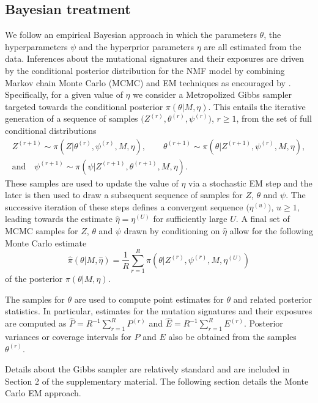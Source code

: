 \documentclass{bioinfo}
\begin{document}
\subsection{Bayesian treatment}
We follow an empirical Bayesian approach in which the parameters
$\theta$, the hyperparameters $\psi$ and the hyperprior parameters
$\eta$ are all estimated from the data.  Inferences about the
mutational signatures and their exposures are driven by the
conditional posterior distribution for the NMF model by combining
Markov chain Monte Carlo (MCMC) and EM techniques as encouraged by
\cite{C01}. Specifically, for a given value of $\eta$ we consider a
Metropolized Gibbs sampler targeted towards the conditional posterior
$\pi(\theta|M, \eta)$. This entails the iterative generation of a
sequence of samples $\big(Z^{(r)}, \theta^{(r)}, \psi^{(r)}\big)$, $r
\geqslant 1$, from the set of full conditional distributions
\begin{gather*}
   Z^{(r+1)} \sim \pi(Z| \theta^{(r)}, \psi^{(r)}, M, \eta), \qquad
   \theta^{(r+1)} \sim \pi(\theta| Z^{(r+1)}, \psi^{(r)}, M, \eta), \\
       \text{and}\quad
   \psi^{(r+1)} \sim \pi(\psi| Z^{(r+1)}, \theta^{(r+1)}, M, \eta).
\end{gather*}
These samples are used to update the value of $\eta$ via a
stochastic EM step and the later is then used to draw a subsequent
sequence of samples for $Z$, $\theta$ and $\psi$. The successive iteration of these steps defines a 
convergent sequence $\big(\eta^{(u)}\big)$, $u \geq 1$, leading
towards the estimate $\hat\eta = \eta^{(U)}$ for
sufficiently large $U$. A final set of MCMC samples for $Z$, $\theta$
and $\psi$ drawn by conditioning on $\hat\eta$ allow for the
following Monte Carlo estimate
\begin{equation}
 \label{eqn:MCEM_estimate}
   \widehat{\pi}(\theta|M, \hat\eta)
 = 
   \frac{1}{R}\sum_{r=1}^R \pi(\theta|Z^{(r)}, \psi^{(r)}, M,
   \eta^{(U)})
\end{equation}
of the posterior $\pi(\theta|M, \eta)$.


The samples for $\theta$ are used to compute point estimates for
$\theta$ and related posterior statistics. In particular, estimates
for the mutation signatures and their exposures are computed as
$\widehat P = R^{-1}\sum_{r=1}^R P^{(r)}$ and $\widehat E =
R^{-1}\sum_{r=1}^R E^{(r)}$. Posterior variances or coverage intervals
for $P$ and $E$ also be obtained from the samples $\theta^{(r)}$. 


Details about the Gibbs sampler are relatively standard and are
included in Section 2 of the supplementary material. The following
section details the Monte Carlo EM approach.
\end{document}
